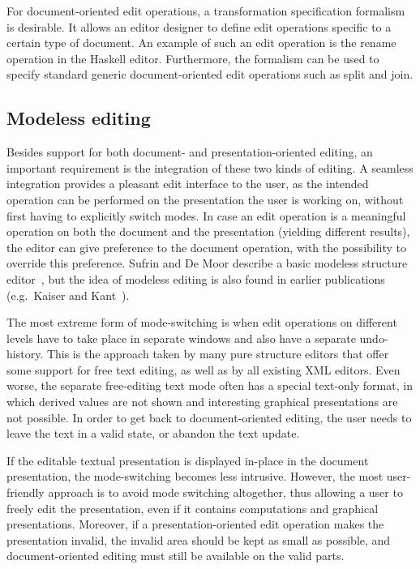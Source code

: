 \documentclass{speauth}
\begin{document}
For document-oriented edit operations, a transformation specification formalism is desirable. It allows an editor designer to define edit operations specific to a certain type of document. An example of such an edit operation is the rename operation in the Haskell editor. Furthermore, the formalism can be used to specify standard generic document-oriented edit operations such as split and join.


%																
\subsection{Modeless editing}

Besides support for both document- and presentation-oriented editing, an important requirement is the integration of these two kinds of editing. A seamless integration provides a pleasant edit interface to the user, as the intended operation can be performed on the presentation the user is working on, without first having to explicitly switch modes. In case an edit operation is a meaningful operation on both the document and the presentation (yielding different results), the editor can give preference to the document operation, with the possibility to override this preference. Sufrin and De Moor describe a basic modeless structure editor~\cite{sufrin99modeless}, but the idea of modeless editing is also found in earlier publications (e.g.\ Kaiser and Kant~\cite{kaiser85parsingWithoutParser}).

The most extreme form of mode-switching is when edit operations on different levels have to take place in separate windows and also have a separate undo-history. This is the approach taken by many pure structure editors that offer some support for free text editing, as well as by all existing XML editors. Even worse, the separate free-editing text mode often has a special text-only format, in which derived values are not shown and interesting graphical presentations are not possible. In order to get back to document-oriented editing, the user needs to leave the text in a valid state, or abandon the text update.

If the editable textual presentation is displayed in-place in the document presentation, the mode-switching becomes less intrusive. However, the most user-friendly approach is to avoid mode switching altogether, thus allowing a user to freely edit the presentation, even if it contains computations and graphical presentations. Moreover, if a presentation-oriented edit operation makes the presentation invalid, the invalid area should be kept as small as possible, and document-oriented editing must still be available on the valid parts.
\end{document}

